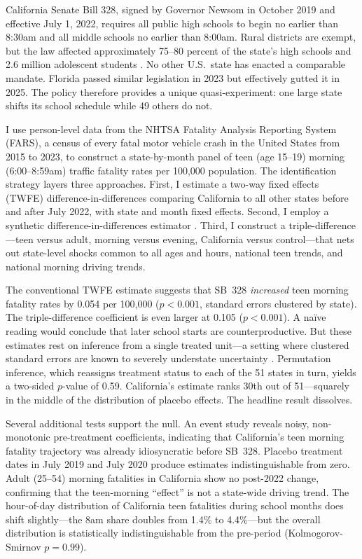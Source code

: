 \documentclass[12pt]{article}
\begin{document}
California Senate Bill 328, signed by Governor Newsom in October 2019 and effective July 1, 2022, requires all public high schools to begin no earlier than 8:30am and all middle schools no earlier than 8:00am. Rural districts are exempt, but the law affected approximately 75--80 percent of the state's high schools and 2.6 million adolescent students \citep{sb328text}. No other U.S.\ state has enacted a comparable mandate. Florida passed similar legislation in 2023 but effectively gutted it in 2025. The policy therefore provides a unique quasi-experiment: one large state shifts its school schedule while 49 others do not.

I use person-level data from the NHTSA Fatality Analysis Reporting System (FARS), a census of every fatal motor vehicle crash in the United States from 2015 to 2023, to construct a state-by-month panel of teen (age 15--19) morning (6:00--8:59am) traffic fatality rates per 100,000 population. The identification strategy layers three approaches. First, I estimate a two-way fixed effects (TWFE) difference-in-differences comparing California to all other states before and after July 2022, with state and month fixed effects. Second, I employ a synthetic difference-in-differences estimator \citep{arkhangelsky2021synthetic}. Third, I construct a triple-difference---teen versus adult, morning versus evening, California versus control---that nets out state-level shocks common to all ages and hours, national teen trends, and national morning driving trends.

The conventional TWFE estimate suggests that SB~328 \emph{increased} teen morning fatality rates by 0.054 per 100,000 ($p < 0.001$, standard errors clustered by state). The triple-difference coefficient is even larger at 0.105 ($p < 0.001$). A na\"ive reading would conclude that later school starts are counterproductive. But these estimates rest on inference from a single treated unit---a setting where clustered standard errors are known to severely understate uncertainty \citep{conley2011inference, ferman2019inference}. Permutation inference, which reassigns treatment status to each of the 51 states in turn, yields a two-sided $p$-value of 0.59. California's estimate ranks 30th out of 51---squarely in the middle of the distribution of placebo effects. The headline result dissolves.

Several additional tests support the null. An event study reveals noisy, non-monotonic pre-treatment coefficients, indicating that California's teen morning fatality trajectory was already idiosyncratic before SB~328. Placebo treatment dates in July 2019 and July 2020 produce estimates indistinguishable from zero. Adult (25--54) morning fatalities in California show no post-2022 change, confirming that the teen-morning ``effect'' is not a state-wide driving trend. The hour-of-day distribution of California teen fatalities during school months does shift slightly---the 8am share doubles from 1.4\% to 4.4\%---but the overall distribution is statistically indistinguishable from the pre-period (Kolmogorov-Smirnov $p = 0.99$).
\end{document}
